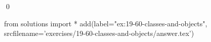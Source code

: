 
\begin{ex}
  \label{ex:19-60-classes-and-objects}
  
  \qed
\end{ex}
\begin{python0}
from solutions import *
add(label="ex:19-60-classes-and-objects",
    srcfilename='exercises/19-60-classes-and-objects/answer.tex')
\end{python0}
